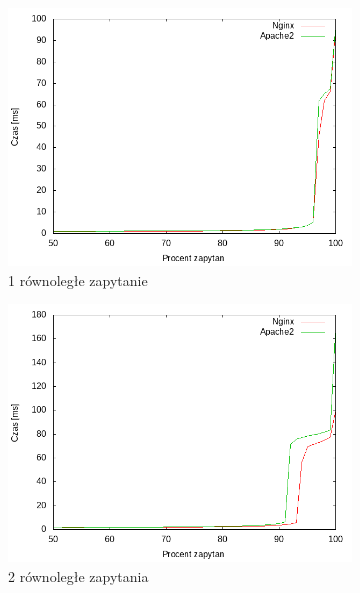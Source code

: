 \begin{figure}
	\centering
	\begin{subfigure}[h]{0.3\textwidth}
		\includegraphics[width=\textwidth]{testy/wybor_fib_5_1.png}
		\caption{1 równoległe zapytanie}
	\end{subfigure}
	\begin{subfigure}[h]{0.3\textwidth}
		\includegraphics[width=\textwidth]{testy/wybor_fib_5_2.png}
		\caption{2 równoległe zapytania}
	\end{subfigure}
	\begin{subfigure}[h]{0.3\textwidth}

\end{subfigure}
\end{figure}
